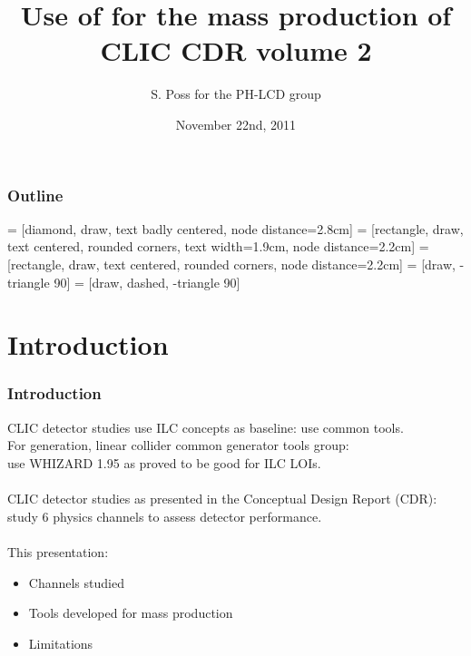 \documentclass{beamer}
\author{S. Poss for the PH-LCD group}
\title{Use of \whizard for the mass production of CLIC CDR volume 2}
\institute[CERN]
{
  CERN
}
\date{November 22nd, 2011}
\newcommand{\whizard}{WHIZARD\xspace}
\begin{document}
\begin{frame}
\titlepage
\end{frame}
\begin{frame}
\frametitle{Outline}
\tableofcontents
\end{frame}
 = [diamond, draw, text badly centered, node distance=2.8cm]
 = [rectangle, draw, text centered, rounded corners, text width=1.9cm, node distance=2.2cm]
 = [rectangle, draw, text centered, rounded corners, node distance=2.2cm]
 = [draw, -triangle 90]
 = [draw, dashed, -triangle 90]
\section{Introduction}

\begin{frame}
\frametitle{Introduction}
CLIC detector studies use ILC concepts as baseline: \alert{use common tools}.\\
For generation, linear collider common generator tools group:\\
use \whizard1.95 as proved to be good for ILC LOIs.\\
~\\
CLIC detector studies as presented in the Conceptual Design Report (CDR):
study 6 physics channels to assess detector performance.\\
~\\
This presentation:
\begin{itemize}
  \item Channels studied
  \item Tools developed for mass production
  \item Limitations
\end{itemize}
\end{frame}
\end{document}
